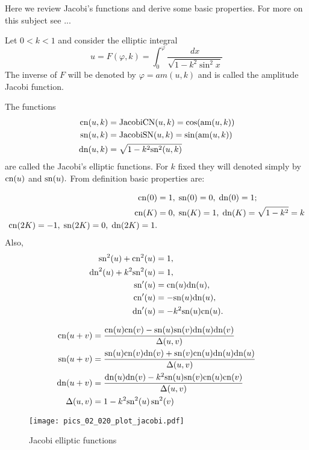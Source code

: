 Here we review Jacobi's functions and derive some basic properties. For more on this subject see ...

Let $0<k<1$ and consider the elliptic integral
\[u=F(\varphi,k)=\int_{0}^{\varphi} \frac {dx}{\sqrt {1-k^2   \sin^2 x  
}} \]
The inverse of $F$ will be denoted by $\varphi=am(u,k)$ and is called the amplitude Jacobi function.

The functions
\begin{align*}
 \mathrm{cn}(u,k)&=\mathrm{JacobiCN}(u,k)=\cos(\mathrm{am}(u,k))\\ \;
 \mathrm{sn}(u,k)&=\mathrm{JacobiSN}(u,k)=\sin(\mathrm{am}(u,k))\\
 \mathrm{dn}(u,k)&=\sqrt{1-k^2\mathrm{sn}^2(u,k)}
 \end{align*}
\noindent  are called the Jacobi's elliptic  functions. 
For $k$ fixed they will denoted simply by $\mathrm{cn}(u)$ and $\mathrm{sn}(u).$
From definition basic properties are:

\begin{align*}
\mathrm{cn}(0)&=1,\; \mathrm{sn}(0)=0, \; \mathrm{dn}(0)=1;\\
\mathrm{cn}(K)&=0,\; \mathrm{sn}(K)=1, \; \mathrm{dn}(K)=\sqrt{1-k^2}=k\\
\mathrm{cn}(2K)=-1,\; \mathrm{sn}(2K)=0, \; \mathrm{dn}(2K)=1.
\end{align*}
Also,
\begin{align*}
 \mathrm{sn}^2(u)  +\mathrm{cn}^2(u)&=1,\\
 \mathrm{dn}^2 (u)+k^2\mathrm{sn}^2(u) &=1,\\
\mathrm{sn}'(u)&=\mathrm{cn}(u)\mathrm{dn}(u),\\
\mathrm{cn}'(u)&=-\mathrm{sn}(u)\mathrm{dn}(u),\\
\mathrm{dn}'(u)&=-k^2\mathrm{sn}(u)\mathrm{cn}(u).
\end{align*}

\begin{align*}
    \mathrm{cn}(u+v)&=\frac{\mathrm{cn}(u)\mathrm{cn}(v)-\mathrm{sn}(u)\mathrm{sn}(v)\mathrm{dn}(u)\mathrm{dn}(v)}{\Delta(u,v)}\\
    \mathrm{sn}(u+v)&=\frac{\mathrm{sn}(u)\mathrm{cn}(v)\mathrm{dn}(v)+\mathrm{sn}(v)\mathrm{cn}(u)\mathrm{dn}(u)\mathrm{dn}(u)}{\Delta(u,v)}\\
    \mathrm{dn}(u+v)&=\frac{\mathrm{dn}(u)\mathrm{dn}(v)-k^2\mathrm{sn}(u)\mathrm{sn}(v)\mathrm{cn}(u)\mathrm{cn}(v) }{\Delta(u,v)}\\
    \Delta(u,v)&=1-k^2\mathrm{sn}^2(u)\,\mathrm{sn}^2(v)
\end{align*}

\begin{figure}[H]
    \begin{center}
    \texttt{[image: pics\_02\_020\_plot\_jacobi.pdf]}
    \caption{Jacobi elliptic functions}
    \label{fig:jacobi_SCD}
    \end{center}
\end{figure}

